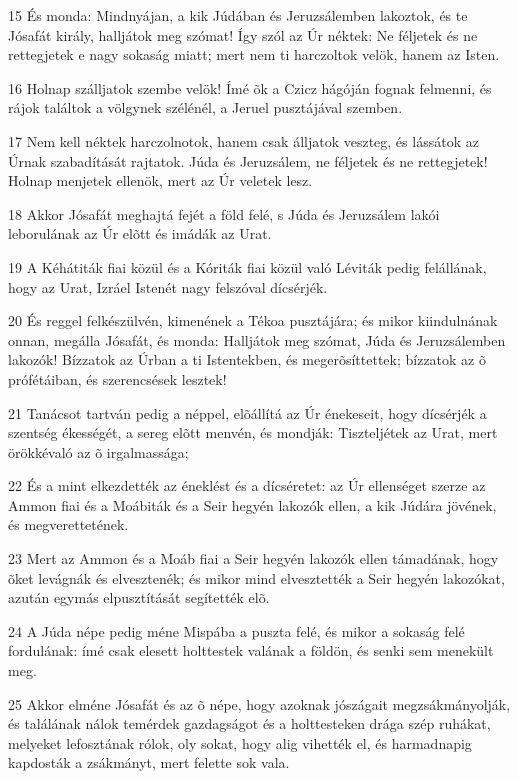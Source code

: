\par 15 És monda: Mindnyájan, a kik Júdában és Jeruzsálemben lakoztok, és te Jósafát király, halljátok meg szómat! Így szól az Úr néktek: Ne féljetek és ne rettegjetek e nagy sokaság miatt; mert nem ti harczoltok velök, hanem az Isten.
\par 16 Holnap szálljatok szembe velök! Ímé õk a Czicz hágóján fognak felmenni, és rájok találtok a völgynek szélénél, a Jeruel pusztájával szemben.
\par 17 Nem kell néktek harczolnotok, hanem csak álljatok veszteg, és lássátok az Úrnak szabadítását rajtatok. Júda és Jeruzsálem, ne féljetek és ne rettegjetek! Holnap menjetek ellenök, mert az Úr veletek lesz.
\par 18 Akkor Jósafát meghajtá fejét a föld felé, s Júda és Jeruzsálem lakói leborulának az Úr elõtt és imádák az Urat.
\par 19 A Kéhátiták fiai közül és a Kóriták fiai közül való Léviták pedig felállának, hogy az Urat, Izráel Istenét nagy felszóval dícsérjék.
\par 20 És reggel felkészülvén, kimenének a Tékoa pusztájára; és mikor kiindulnának onnan, megálla Jósafát, és monda: Halljátok meg szómat, Júda és Jeruzsálemben lakozók! Bízzatok az Úrban a ti Istentekben, és megerõsíttettek; bízzatok az õ prófétáiban, és szerencsések lesztek!
\par 21 Tanácsot tartván pedig a néppel, elõállítá az Úr énekeseit, hogy dícsérjék a szentség ékességét, a sereg elõtt menvén, és mondják: Tiszteljétek az Urat, mert örökkévaló az õ irgalmassága;
\par 22 És a mint elkezdették az éneklést és a dícséretet: az Úr ellenséget szerze az Ammon fiai és a Moábiták és a Seir hegyén lakozók ellen, a kik Júdára jövének, és megverettetének.
\par 23 Mert az Ammon és a Moáb fiai a Seir hegyén lakozók ellen támadának, hogy õket levágnák és elvesztenék; és mikor mind elvesztették a Seir hegyén lakozókat, azután egymás elpusztítását segítették elõ.
\par 24 A Júda népe pedig méne Mispába a puszta felé, és mikor a sokaság felé fordulának: ímé csak elesett holttestek valának a földön, és senki sem menekült meg.
\par 25 Akkor elméne Jósafát és az õ népe, hogy azoknak jószágait megzsákmányolják, és találának nálok temérdek gazdagságot és a holttesteken drága szép ruhákat, melyeket lefosztának rólok, oly sokat, hogy alig vihették el, és harmadnapig kapdosták a zsákmányt, mert felette sok vala.
